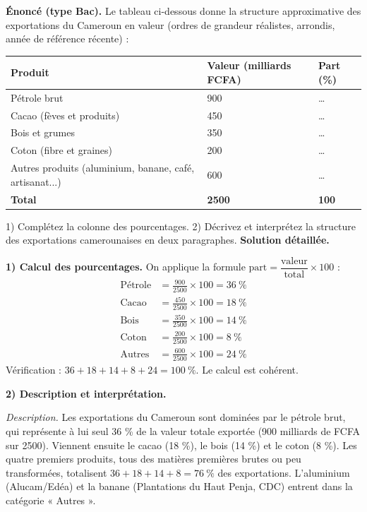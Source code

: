 \documentclass[11pt]{article}
\begin{document}
\begin{exoresolu}
\textbf{Énoncé (type Bac).} Le tableau ci-dessous donne la structure approximative des exportations du Cameroun en valeur (ordres de grandeur réalistes, arrondis, année de référence récente) :
\begin{center}
\begin{tabularx}{\linewidth}{|l|X|X|}\hline
\rowcolor{popblueL} \textbf{Produit} & \textbf{Valeur (milliards FCFA)} & \textbf{Part (\%)} \\ \hline
Pétrole brut & 900 & \ldots \\ \hline
Cacao (fèves et produits) & 450 & \ldots \\ \hline
Bois et grumes & 350 & \ldots \\ \hline
Coton (fibre et graines) & 200 & \ldots \\ \hline
Autres produits (aluminium, banane, café, artisanat...) & 600 & \ldots \\ \hline
\textbf{Total} & \textbf{2500} & \textbf{100} \\ \hline
\end{tabularx}
\end{center}
1) Complétez la colonne des pourcentages. 2) Décrivez et interprétez la structure des exportations camerounaises en deux paragraphes.
\tcblower
\textbf{Solution détaillée.}

\textbf{1) Calcul des pourcentages.} On applique la formule $\text{part} = \dfrac{\text{valeur}}{\text{total}} \times 100$ :
\begin{align*}
\text{Pétrole} &= \frac{900}{2500} \times 100 = 36\ \% \\
\text{Cacao} &= \frac{450}{2500} \times 100 = 18\ \% \\
\text{Bois} &= \frac{350}{2500} \times 100 = 14\ \% \\
\text{Coton} &= \frac{200}{2500} \times 100 = 8\ \% \\
\text{Autres} &= \frac{600}{2500} \times 100 = 24\ \%
\end{align*}
Vérification : $36 + 18 + 14 + 8 + 24 = 100\ \%$. Le calcul est cohérent.

\textbf{2) Description et interprétation.}

\emph{Description.} Les exportations du Cameroun sont dominées par le pétrole brut, qui représente à lui seul 36 \% de la valeur totale exportée (900 milliards de FCFA sur 2500). Viennent ensuite le cacao (18 \%), le bois (14 \%) et le coton (8 \%). Les quatre premiers produits, tous des matières premières brutes ou peu transformées, totalisent $36 + 18 + 14 + 8 = 76\ \%$ des exportations. L'aluminium (Alucam/Edéa) et la banane (Plantations du Haut Penja, CDC) entrent dans la catégorie « Autres ».


\end{exoresolu}
\end{document}
